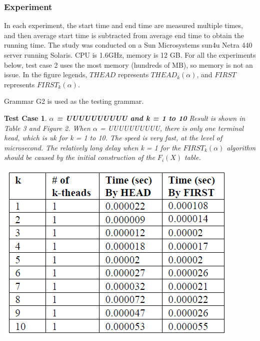 \documentclass{sig-alternate-05-2015}
\newtheorem{TestCase}{Test Case}
\begin{document}
\subsubsection{Experiment}
In each experiment, the start time and end time are measured
multiple times, and then average start time is subtracted
from average end time to obtain the running time. The
study was conducted on a Sun Microsystems sun4u Netra
440 server running Solaris. CPU is 1.6GHz, memory is 12
GB. For all the experiments below, test case 2 uses the
most memory (hundreds of MB), so memory is not an issue.
In the figure legends, $THEAD$ represents $THEAD_k(\alpha)$,
and $FIRST$ represents $FIRST_k(\alpha)$.

Grammar G2 is used as the testing grammar.
\begin{TestCase}
\textbf{$\alpha$ = UUUUUUUUUU and k = 1 to 10}
Result is shown in Table 3 and Figure 2. When $\alpha$ =
UUUUUUUUUU, there is only one terminal head, which is
uk for k = 1 to 10. The speed is very fast, at the level of
microsecond. The relatively long delay when k = 1 for the
$FIRST_k(\alpha)$ algorithm should be caused by the initial construction
of the $F_i(X)$ table.


\begin{table}[h]
\centering
\includegraphics[scale=0.5]{table3.PNG}
\caption{Number of generated k-theads and time spent on
input string UUUUUUUUUU, for k = 1 to 10}
\label{table:3}
\end{table}


\end{TestCase}
\end{document}
